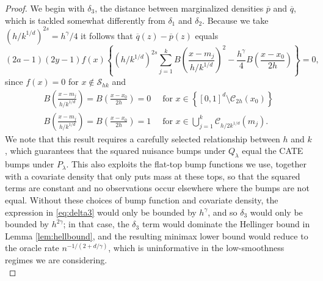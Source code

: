 \documentclass[11pt,twoside]{article}
\theoremstyle{definition}
\theoremstyle{remark}
\begin{document}
\begin{proof}
We begin with $\delta_3$, the distance between marginalized densities $\overline{p}$ and $\overline{q}$, which is tackled somewhat differently from $\delta_1$ and $\delta_2$. Because we take $(h/k^{1/d})^{2s} = h^\gamma/4$ it follows that $\overline{q}(z) - \overline{p}(z)$ equals
\begin{equation}
 (2a-1)(2y-1) f(x) \left\{   \left( h/k^{1/d} \right)^{2s} \sum_{j=1}^k B \left( \frac{x-m_j}{h/k^{1/d}}  \right)^2 - \frac{h^\gamma}{4} B\left( \frac{x-x_0}{2h} \right) \right\} = 0  , \label{eq:delta3}
\end{equation}
since  $f(x) = 0$ for $x \notin \mathcal{S}_{hk}$ and
\begin{align*}
B \left( \frac{x-m_j}{h/k^{1/d}}  \right)=B\left(\frac{x-x_0}{2h} \right) = 0 & \ \text{ for } x \in \left\{ [0,1]^d \setminus \mathcal{C}_{2h}(x_0) \right\} \\
B \left( \frac{x-m_j}{h/k^{1/d}}  \right)=B\left(\frac{x-x_0}{2h} \right) = 1 & \ \text{ for } x \in \bigcup_{j=1}^k \mathcal{C}_{h/2k^{1/d}}(m_j) . 
\end{align*}
We note that this result requires a carefully selected relationship between $h$ and $k$, which guarantees that the squared nuisance bumps under $Q_\lambda$ equal the CATE bumps under $P_\lambda$. This also exploits the flat-top bump functions we use, together with a covariate density that only puts mass at these tops, so that the squared terms are constant and no observations occur elsewhere where the bumps are not equal. Without these choices of bump function and covariate density, the expression in \eqref{eq:delta3} would only be bounded by $h^\gamma$, and so $\delta_3$ would only be bounded by $h^{2\gamma}$; in that case,  the $\delta_3$ term would dominate the Hellinger bound in Lemma \ref{lem:hellbound}, and the resulting minimax lower bound would reduce to the oracle rate $n^{-1/(2+d/\gamma)}$, which is uninformative in the low-smoothness regimes we are considering. \\


\end{proof}
\end{document}
